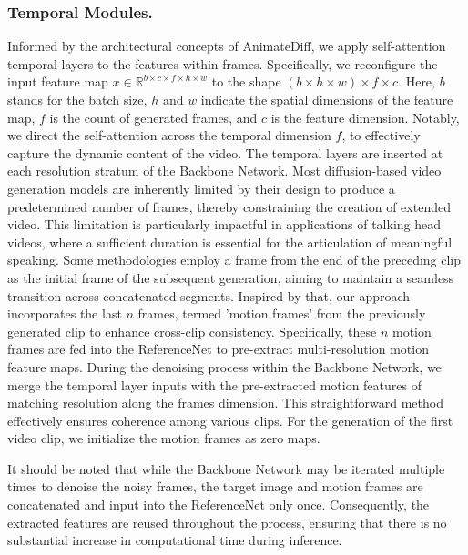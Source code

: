 \subsubsection{Temporal Modules.} 
\label{sec:temporalmodule}
Informed by the architectural concepts of AnimateDiff, we apply self-attention temporal layers to the features within frames. Specifically, we reconfigure the input feature map $x \in \mathbb{R}^{b \times c \times f \times h \times w}$ to the shape ${(b \times h \times w) \times f \times c}$. Here, $b$ stands for the batch size, $h$ and $w$ indicate the spatial dimensions of the feature map, $f$ is the count of generated frames, and $c$ is the feature dimension. Notably, we direct the self-attention across the temporal dimension $f$, to effectively capture the dynamic content of the video. The temporal layers are inserted at each resolution stratum of the Backbone Network. 
Most diffusion-based video generation models are inherently limited by their design to produce a predetermined number of frames, thereby constraining the creation of extended video. This limitation is particularly impactful in applications of talking head videos, where a sufficient duration is essential for the articulation of meaningful speaking. Some methodologies employ a frame from the end of the preceding clip as the initial frame of the subsequent generation, aiming to maintain a seamless transition across concatenated segments. Inspired by that, our approach incorporates the last $n$ frames, termed 'motion frames' from the previously generated clip to enhance cross-clip consistency. Specifically, these $n$ motion frames are fed into the ReferenceNet to pre-extract multi-resolution motion feature maps. During the denoising process within the Backbone Network, we merge the temporal layer inputs with the pre-extracted motion features of matching resolution along the frames dimension. This straightforward method effectively ensures coherence among various clips. For the generation of the first video clip, we initialize the motion frames as zero maps.

It should be noted that while the Backbone Network may be iterated multiple times to denoise the noisy frames, the target image and motion frames are concatenated and input into the ReferenceNet only once. Consequently, the extracted features are reused throughout the process, ensuring that there is no substantial increase in computational time during inference.

